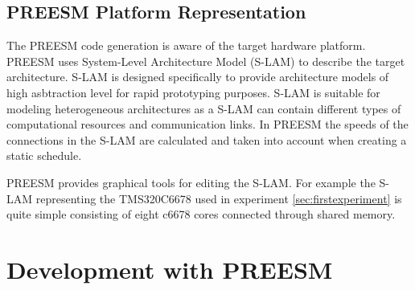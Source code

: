 \subsection{PREESM Platform Representation}
The PREESM code generation is aware of the target hardware platform. PREESM
uses System-Level Architecture Model (S-LAM) \cite{pelcat2009system} to
describe the target architecture. S-LAM is designed specifically to provide
architecture models of high asbtraction level for rapid prototyping purposes.
S-LAM is suitable for modeling heterogeneous architectures as a S-LAM can
contain different types of computational resources and communication links.  In
PREESM the speeds of the connections in the S-LAM are calculated and taken into
account when creating a static schedule. \cite{pelcat2009system}

PREESM provides graphical tools for editing the S-LAM. For example the S-LAM
representing the TMS320C6678 used in experiment \ref{sec:firstexperiment} is
quite simple consisting of eight c6678 cores connected through shared memory.

\section{Development with PREESM}
\label{sec:preesmdev}

